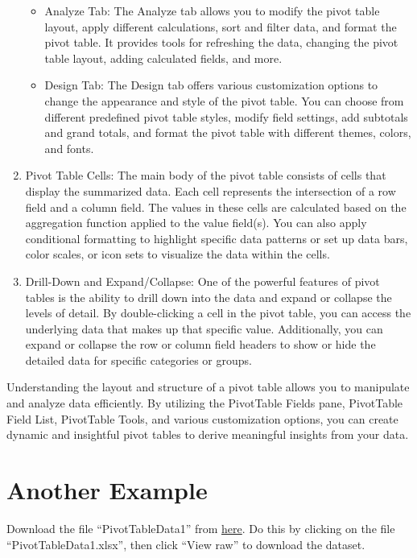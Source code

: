 \documentclass[
]{book}
\providecommand{\tightlist}{%
  \setlength{\itemsep}{0pt}\setlength{\parskip}{0pt}}
\begin{document}
\begin{enumerate}
  \begin{itemize}
  \tightlist
  \item
    Analyze Tab: The Analyze tab allows you to modify the pivot table layout, apply different calculations, sort and filter data, and format the pivot table. It provides tools for refreshing the data, changing the pivot table layout, adding calculated fields, and more.
  \item
    Design Tab: The Design tab offers various customization options to change the appearance and style of the pivot table. You can choose from different predefined pivot table styles, modify field settings, add subtotals and grand totals, and format the pivot table with different themes, colors, and fonts.
  \end{itemize}
\item
  Pivot Table Cells:
  The main body of the pivot table consists of cells that display the summarized data. Each cell represents the intersection of a row field and a column field. The values in these cells are calculated based on the aggregation function applied to the value field(s). You can also apply conditional formatting to highlight specific data patterns or set up data bars, color scales, or icon sets to visualize the data within the cells.
\item
  Drill-Down and Expand/Collapse:
  One of the powerful features of pivot tables is the ability to drill down into the data and expand or collapse the levels of detail. By double-clicking a cell in the pivot table, you can access the underlying data that makes up that specific value. Additionally, you can expand or collapse the row or column field headers to show or hide the detailed data for specific categories or groups.
\end{enumerate}

Understanding the layout and structure of a pivot table allows you to manipulate and analyze data efficiently. By utilizing the PivotTable Fields pane, PivotTable Field
List, PivotTable Tools, and various customization options, you can create dynamic and insightful pivot tables to derive meaningful insights from your data.

\hypertarget{another-example}{%
\section{Another Example}\label{another-example}}

Download the file ``PivotTableData1'' from \href{https://github.com/JoeH123/Data}{here}. Do this by clicking on the file ``PivotTableData1.xlsx'', then click ``View raw'' to download the dataset.
\end{document}
